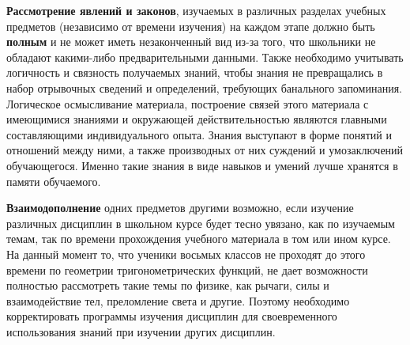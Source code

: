 \begin{textitemize}
	\item \textbf{Рассмотрение явлений и законов}, изучаемых в различных разделах учебных предметов (независимо от времени изучения) на каждом этапе должно быть \textbf{полным} и не может иметь незаконченный вид из-за того, что школьники не обладают какими-либо предварительными данными. Также необходимо учитывать логичность и связность получаемых знаний, чтобы знания не превращались в набор отрывочных сведений и определений, требующих банального запоминания. Логическое осмысливание материала, построение связей этого материала с имеющимися знаниями и окружающей действительностью являются главными составляющими индивидуального опыта. Знания выступают в форме понятий и отношений между ними, а также производных от них суждений и умозаключений обучающегося. Именно такие знания в виде навыков и умений лучше хранятся в памяти обучаемого.
	\item \textbf{Взаимодополнение} одних предметов другими возможно, если изучение различных дисциплин в школьном курсе будет тесно увязано, как по изучаемым темам, так по времени прохождения учебного материала в том или ином курсе. На данный момент то, что ученики восьмых классов не проходят до этого времени по геометрии тригонометрических функций, не дает возможности полностью рассмотреть такие темы по физике, как рычаги, силы и взаимодействие тел, преломление света и другие. Поэтому необходимо корректировать программы изучения дисциплин для своевременного использования знаний при изучении других дисциплин. 

\end{textitemize}
